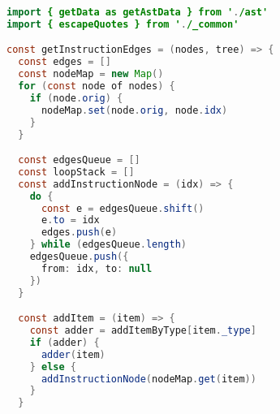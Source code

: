 \begin{lstlisting}[language=Java,
caption={asg.js}]
import { getData as getAstData } from './ast'
import { escapeQuotes } from './_common'

const getInstructionEdges = (nodes, tree) => {
  const edges = []
  const nodeMap = new Map()
  for (const node of nodes) {
    if (node.orig) {
      nodeMap.set(node.orig, node.idx)
    }
  }

  const edgesQueue = []
  const loopStack = []
  const addInstructionNode = (idx) => {
    do {
      const e = edgesQueue.shift()
      e.to = idx
      edges.push(e)
    } while (edgesQueue.length)
    edgesQueue.push({
      from: idx, to: null
    })
  }

  const addItem = (item) => {
    const adder = addItemByType[item._type]
    if (adder) {
      adder(item)
    } else {
      addInstructionNode(nodeMap.get(item))
    }
  }


\end{lstlisting}

